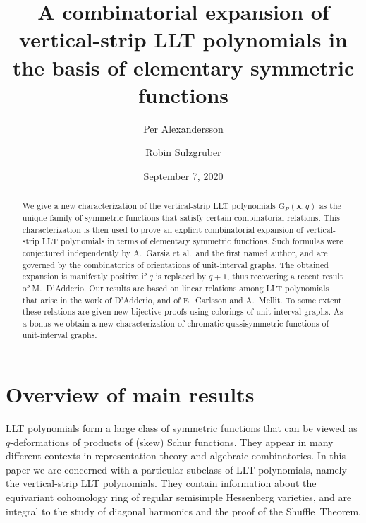 \documentclass[reqno]{amsart}
\title[A combinatorial \texorpdfstring{$e$}{e}-expansion of vertical-strip LLT polynomials]{%
A combinatorial expansion of vertical-strip LLT polynomials in the basis of elementary symmetric functions}
\author{Per Alexandersson}
\author{Robin Sulzgruber}
\date{September 7, 2020}
\newcommand{\xvec}{\mathbf{x}}
\newcommand{\LLT}{\mathrm{G}}
\begin{document}
\begin{abstract}
We give a new characterization of the vertical-strip LLT polynomials $\LLT_P(\xvec;q)$ as the unique family of symmetric functions that satisfy certain combinatorial relations.
This characterization is then used to prove an explicit combinatorial expansion of vertical-strip LLT polynomials in terms of elementary symmetric functions.
Such formulas were conjectured independently by A.~Garsia et al.~and the first named author, 
and are governed by the combinatorics of orientations of unit-interval graphs.
The obtained expansion is manifestly positive if $q$ is replaced by $q+1$, thus recovering a recent result of M.~D'Adderio.
Our results are based on linear relations among LLT polynomials that arise in the work of D'Adderio, and of E.~Carlsson and A.~Mellit.
To some extent these relations are given new bijective proofs using colorings of unit-interval graphs.
As a bonus we obtain a new characterization of chromatic quasisymmetric functions of unit-interval graphs.
\end{abstract}




\maketitle


\setcounter{tocdepth}{2}
\tableofcontents



\section{Overview of main results}

LLT polynomials form a large class of symmetric functions that can be viewed as $q$-deformations of products of (skew) Schur functions.
They appear in many different contexts in representation theory and algebraic combinatorics.
In this paper we are concerned with a particular subclass of LLT polynomials, namely the vertical-strip LLT polynomials.
They contain information about the equivariant cohomology ring of 
regular semisimple Hessenberg varieties, and are integral to the study 
of diagonal harmonics and the proof of the Shuffle~Theorem.
\end{document}
